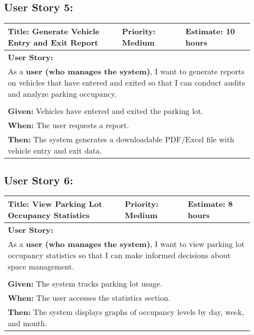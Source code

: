 \subsection{User Story 5:}
\begin{table}[H]
    \centering
    \begin{tabular}{|p{}|p{}|p{}|}
        \hline
        \rowcolor{lightblue}
        \textbf{Title: Generate Vehicle Entry and Exit Report} & \textbf{Priority: Medium} & \textbf{Estimate: 10 hours} \\
        \hline
        \multicolumn{3}{|l|}{\textbf{User Story:}} \\
        \multicolumn{3}{|p{15cm}|}{As a \textbf{user (who manages the system)}, I want to generate reports on vehicles that have entered and exited so that I can conduct audits and analyze parking occupancy.} \\
        \hline
        \rowcolor{lightblue}
        \multicolumn{3}{|c|}{\textbf{Acceptance Criteria:}} \\
        \hline
        \multicolumn{3}{|l|}{\textbf{Given:} Vehicles have entered and exited the parking lot.} \\
        \multicolumn{3}{|l|}{\textbf{When:} The user requests a report.} \\
        \multicolumn{3}{|l|}{\textbf{Then:} The system generates a downloadable PDF/Excel file with vehicle entry and exit data.} \\
        \hline
    \end{tabular}
\end{table}

\subsection{User Story 6:}
\begin{table}[H]
    \centering
    \begin{tabular}{|p{}|p{}|p{}|}
        \hline
        \rowcolor{lightblue}
        \textbf{Title: View Parking Lot Occupancy Statistics} & \textbf{Priority: Medium} & \textbf{Estimate: 8 hours} \\
        \hline
        \multicolumn{3}{|l|}{\textbf{User Story:}} \\
        \multicolumn{3}{|p{15cm}|}{As a \textbf{user (who manages the system)}, I want to view parking lot occupancy statistics so that I can make informed decisions about space management.} \\
        \hline
        \rowcolor{lightblue}
        \multicolumn{3}{|c|}{\textbf{Acceptance Criteria:}} \\
        \hline
        \multicolumn{3}{|l|}{\textbf{Given:} The system tracks parking lot usage.} \\
        \multicolumn{3}{|l|}{\textbf{When:} The user accesses the statistics section.} \\
        \multicolumn{3}{|l|}{\textbf{Then:} The system displays graphs of occupancy levels by day, week, and month.} \\
        \hline
    \end{tabular}
\end{table}

